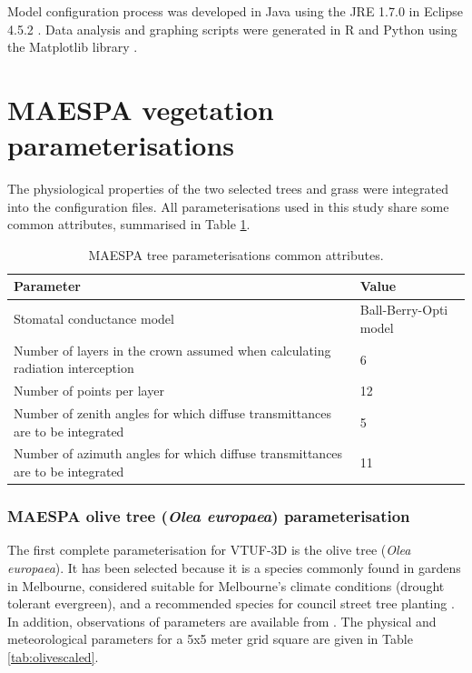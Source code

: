 \documentclass[preprint,12pt,authoryear]{elsarticle}
\begin{document}
Model configuration process was developed in Java using the JRE 1.7.0 \citep{Oracle2016} in Eclipse 4.5.2 \citep{Eclipse2016}. Data analysis and graphing scripts were generated in R \citep{R2013} and Python \citep{Python2016} using the Matplotlib library \citep{Hunter2007}. 


\appendix


\section{MAESPA vegetation parameterisations}\label{sec:maespavegpara}  %

The physiological properties of the two selected trees and grass were integrated into the configuration files. All parameterisations used in this study share some common attributes, summarised in Table \ref{tab:commonattr}.

\begin{table}[!htbp]
\caption{MAESPA tree parameterisations common attributes. \label{tab:commonattr}} 
\begin{tabular}{ |  p{13cm} | p{4cm} |}
\hline \textbf{Parameter} & \textbf{Value}  \\ 
\hline
Stomatal conductance model & Ball-Berry-Opti model \citep{Medlyn2011} \\ \hline
Number of layers in the crown assumed when calculating radiation interception &6	 \\ \hline
Number of points per layer&12 \\ \hline
Number of zenith angles for which diffuse transmittances are to be integrated &5   \\ \hline
Number of azimuth angles for which diffuse transmittances are to be integrated&11  \\ \hline
\end{tabular} 
\end{table}








\subsubsection{MAESPA olive tree (\textit{Olea europaea}) parameterisation}
The first complete parameterisation for VTUF-3D is the olive tree (\textit{Olea europaea}). It has been selected because it is a species commonly found in gardens in Melbourne, considered suitable for Melbourne's climate conditions (drought tolerant evergreen), and a recommended species for council street tree planting \citep{PortPhillip2010}. In addition, observations of parameters are available from \cite{Coutts2014a}. The physical and meteorological parameters for a 5x5 meter grid square are given in Table \ref{tab:olivescaled}. 
\end{document}
